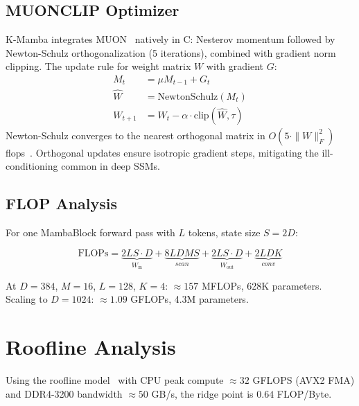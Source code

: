 \documentclass[10pt,onecolumn]{article}
\begin{document}
\subsection{MUONCLIP Optimizer}

K-Mamba integrates MUON~\cite{muon2025} natively in C:
Nesterov momentum followed by Newton-Schulz orthogonalization
(5 iterations), combined with gradient norm clipping.
The update rule for weight matrix $W$ with gradient $G$:
\begin{align}
  M_t &= \mu M_{t-1} + G_t \\
  \hat{W} &= \text{NewtonSchulz}(M_t) \\
  W_{t+1} &= W_t - \alpha \cdot \text{clip}(\hat{W}, \tau)
\end{align}
Newton-Schulz converges to the nearest orthogonal matrix in
$O(5 \cdot \|W\|_F^2)$ flops~\cite{bjorck1971}.
Orthogonal updates ensure isotropic gradient steps,
mitigating the ill-conditioning common in deep SSMs.

\subsection{FLOP Analysis}

For one MambaBlock forward pass with $L$ tokens, state size $S = 2D$:

\begin{equation}
  \text{FLOPs} = \underbrace{2LS \cdot D}_{W_\text{in}}
               + \underbrace{8LDMS}_{scan}
               + \underbrace{2LS \cdot D}_{W_\text{out}}
               + \underbrace{2LDK}_{conv}
\end{equation}

At $D = 384$, $M = 16$, $L = 128$, $K = 4$: $\approx 157$ MFLOPs,
628K parameters. Scaling to $D = 1024$: $\approx 1.09$ GFLOPs, 4.3M parameters.

\section{Roofline Analysis}
\label{sec:roofline}

Using the roofline model~\cite{williams2009roofline} with
CPU peak compute $\approx 32$ GFLOPS (AVX2 FMA) and
DDR4-3200 bandwidth $\approx 50$ GB/s,
the ridge point is $0.64$ FLOP/Byte.
\end{document}
